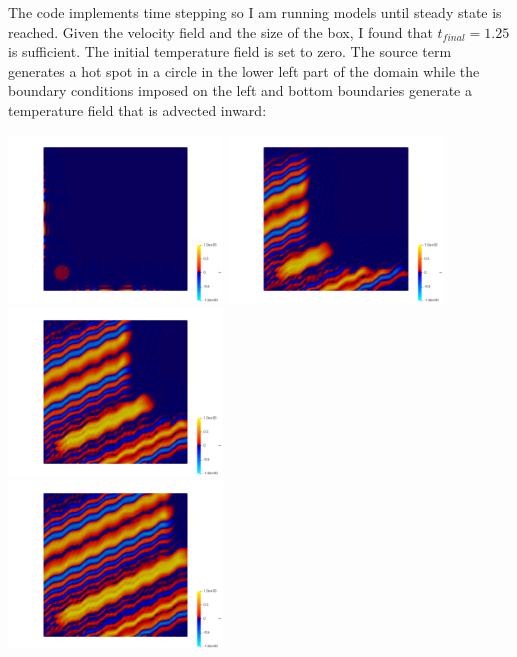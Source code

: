 The code implements time stepping so I am running models until steady state is reached. 
Given the velocity field and the size of the box, I found that $t_{final}=1.25$ is sufficient.
The initial temperature field is set to zero. The source term generates a hot spot in a circle 
in the lower left part of the domain while the boundary conditions imposed on the left and bottom 
boundaries generate a temperature field that is advected inward:

\begin{center}
\includegraphics[width=5.7cm]{python_codes/fieldstone_43/results/experiment9/T.0000.png}
\includegraphics[width=5.7cm]{python_codes/fieldstone_43/results/experiment9/T.0010.png}
\includegraphics[width=5.7cm]{python_codes/fieldstone_43/results/experiment9/T.0020.png}\\
\includegraphics[width=5.7cm]{python_codes/fieldstone_43/results/experiment9/T.0030.png}

\end{center}
